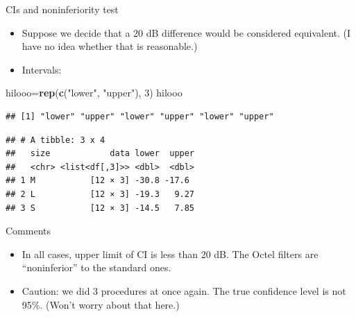 \documentclass[ignorenonframetext,]{beamer}
\newenvironment{Shaded}{\begin{snugshade}}{\end{snugshade}}
\newcommand{\DataTypeTok}[1]{\textcolor[rgb]{0.13,0.29,0.53}{#1}}
\newcommand{\DecValTok}[1]{\textcolor[rgb]{0.00,0.00,0.81}{#1}}
\newcommand{\KeywordTok}[1]{\textcolor[rgb]{0.13,0.29,0.53}{\textbf{#1}}}
\newcommand{\NormalTok}[1]{#1}
\newcommand{\OperatorTok}[1]{\textcolor[rgb]{0.81,0.36,0.00}{\textbf{#1}}}
\newcommand{\StringTok}[1]{\textcolor[rgb]{0.31,0.60,0.02}{#1}}
\begin{document}
\begin{frame}[fragile]{CIs and noninferiority test}
\protect\hypertarget{cis-and-noninferiority-test}{}

\begin{itemize}
\item
  Suppose we decide that a 20 dB difference would be considered
  equivalent. (I have no idea whether that is reasonable.)
\item
  Intervals: \vspace{2ex}
\end{itemize}

\small

\begin{Shaded}
\begin{Highlighting}[]
\NormalTok{hilooo=}\KeywordTok{rep}\NormalTok{(}\KeywordTok{c}\NormalTok{(}\StringTok{"lower"}\NormalTok{, }\StringTok{"upper"}\NormalTok{), }\DecValTok{3}\NormalTok{)}
\NormalTok{hilooo}
\end{Highlighting}
\end{Shaded}

\begin{verbatim}
## [1] "lower" "upper" "lower" "upper" "lower" "upper"
\end{verbatim}

\begin{Shaded}
\end{Shaded}

\begin{verbatim}
## # A tibble: 3 x 4
##   size            data lower  upper
##   <chr> <list<df[,3]>> <dbl>  <dbl>
## 1 M           [12 × 3] -30.8 -17.6 
## 2 L           [12 × 3] -19.3   9.27
## 3 S           [12 × 3] -14.5   7.85
\end{verbatim}

\normalsize

\end{frame}

\begin{frame}{Comments}
\protect\hypertarget{comments-17}{}

\begin{itemize}
\item
  In all cases, upper limit of CI is less than 20 dB. The Octel filters
  are ``noninferior'' to the standard ones.
\item
  Caution: we did 3 procedures at once again. The true confidence level
  is not 95\%. (Won't worry about that here.)
\end{itemize}

\end{frame}
\end{document}
